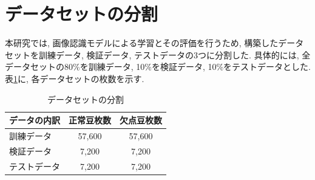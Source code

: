 \section{データセットの分割}
本研究では, 画像認識モデルによる学習とその評価を行うため, 構築したデータセットを訓練データ, 検証データ, テストデータの3つに分割した. 
具体的には, 全データセットの80\%を訓練データ, 10\%を検証データ, 10\%をテストデータとした. 
表\ref{table:dataset_split}に, 各データセットの枚数を示す. 

\begin{table}[htbp]
\centering
\caption{データセットの分割}
\label{table:dataset_split}
\begin{tabular}{lcc} \hline
  データの内訳 & 正常豆枚数 & 欠点豆枚数 \\ \hline
  訓練データ & 57,600 & 57,600 \\
  検証データ & 7,200 & 7,200 \\
  テストデータ & 7,200 & 7,200 \\ \hline
\end{tabular}
\end{table}